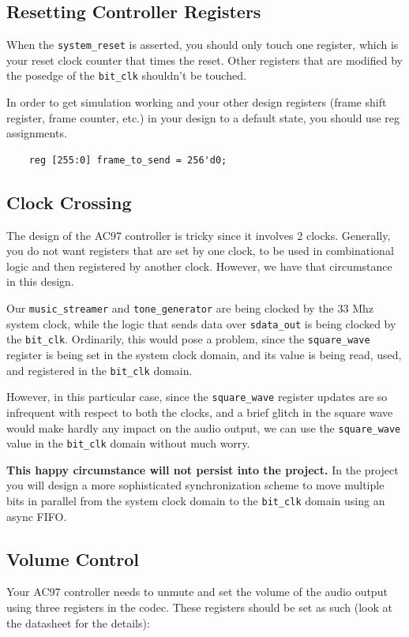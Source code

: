 \documentclass[11pt]{article}
\begin{document}
\subsection{Resetting Controller Registers}
When the \verb|system_reset| is asserted, you should only touch one register, which is your reset clock counter that times the reset. Other registers that are modified by the posedge of the \verb|bit_clk| shouldn't be touched.

In order to get simulation working and your other design registers (frame shift register, frame counter, etc.) in your design to a default state, you should use reg assignments.

\begin{verbatim}
	reg [255:0] frame_to_send = 256'd0;
\end{verbatim}

\subsection{Clock Crossing}
The design of the AC97 controller is tricky since it involves 2 clocks. Generally, you do not want registers that are set by one clock, to be used in combinational logic and then registered by another clock. However, we have that circumstance in this design.

Our \verb|music_streamer| and \verb|tone_generator| are being clocked by the 33 Mhz system clock, while the logic that sends data over \verb|sdata_out| is being clocked by the \verb|bit_clk|. Ordinarily, this would pose a problem, since the \verb|square_wave| register is being set in the system clock domain, and its value is being read, used, and registered in the \verb|bit_clk| domain. 

However, in this particular case, since the \verb|square_wave| register updates are so infrequent with respect to both the clocks, and a brief glitch in the square wave would make hardly any impact on the audio output, we can use the \verb|square_wave| value in the \verb|bit_clk| domain without much worry.

\textbf{This happy circumstance will not persist into the project.} In the project you will design a more sophisticated synchronization scheme to move multiple bits in parallel from the system clock domain to the \verb|bit_clk| domain using an async FIFO.

\subsection{Volume Control}
Your AC97 controller needs to unmute and set the volume of the audio output using three registers in the codec. These registers should be set as such (look at the datasheet for the details):
\end{document}

